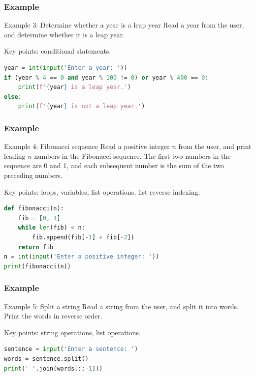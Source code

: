 \documentclass[beamer, en, version=2.0]{huangfusl-template}
\begin{document}
    \begin{frame}[fragile]
        \frametitle{Example}

        \begin{block}{Example 3: Determine whether a year is a leap year}
            Read a year from the user, and determine whether it is a leap year.
        \end{block}

        Key points: conditional statements.

        \pause

\begin{lstlisting}[language=python]
year = int(input('Enter a year: '))
if (year % 4 == 0 and year % 100 != 0) or year % 400 == 0:
    print(f'{year} is a leap year.')
else:
    print(f'{year} is not a leap year.')
\end{lstlisting}
    \end{frame}
    \begin{frame}[fragile]
        \frametitle{Example}

        \begin{block}{Example 4: Fibonacci sequence}
            Read a positive integer $n$ from the user, and print leading $n$ numbers in the Fibonacci sequence. The first two numbers in the sequence are 0 and 1, and each subsequent number is the sum of the two preceding numbers.
        \end{block}

        Key points: loops, variables, list operations, list reverse indexing.

        \pause

\begin{lstlisting}[language=python]
def fibonacci(n):
    fib = [0, 1]
    while len(fib) < n:
        fib.append(fib[-1] + fib[-2])
    return fib
n = int(input('Enter a positive integer: '))
print(fibonacci(n))
\end{lstlisting}
    \end{frame}
    \begin{frame}[fragile]
        \frametitle{Example}

        \begin{block}{Example 5: Split a string}
            Read a string from the user, and split it into words. Print the words in reverse order.
        \end{block}

        Key points: string operations, list operations.

        \pause

\begin{lstlisting}[language=python]
sentence = input('Enter a sentence: ')
words = sentence.split()
print(' '.join(words[::-1]))
\end{lstlisting}
    \end{frame}
\end{document}
